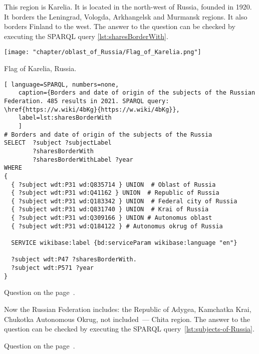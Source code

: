 \begin{exercise}
	\label{answer:subjects_of_Russia_1}
	This region is Karelia. It is located in the north-west of Russia, founded in \num{1920}. It borders the Leningrad, Vologda, Arkhangelsk and Murmansk regions. It also borders Finland to the west.  The answer to the question can be checked by executing the SPARQL query \ref{lst:sharesBorderWith}.
\end{exercise}	
	\begin{marginfigure}[2.0cm]
{
	\setlength{\fboxsep}{0pt}%
	\setlength{\fboxrule}{1pt}%
	\texttt{[image: "chapter/oblast\_of\_Russia/Flag\_of\_Karelia.png"]}
}
\caption [Flag of Karelia, Russia.]{Flag of Karelia, Russia.}%
\label{fig:Flag_of_Karelia}%
\end{marginfigure}
	
	\begin{lstlisting}[ language=SPARQL, numbers=none,
	caption={Borders and date of origin of the subjects of the Russian Federation. 485 results in 2021. SPARQL query: \href{https://w.wiki/4bKg}{https://w.wiki/4bKg}},
	label=lst:sharesBorderWith
	]
# Borders and date of origin of the subjects of the Russia
SELECT  ?subject ?subjectLabel 
        ?sharesBorderWith 
        ?sharesBorderWithLabel ?year
WHERE
{
  { ?subject wdt:P31 wd:Q835714 } UNION  # Oblast of Russia
  { ?subject wdt:P31 wd:Q41162 } UNION  # Republic of Russia
  { ?subject wdt:P31 wd:Q183342 } UNION  # Federal city of Russia
  { ?subject wdt:P31 wd:Q831740 } UNION  # Krai of Russia
  { ?subject wdt:P31 wd:Q309166 } UNION # Autonomus oblast
  { ?subject wdt:P31 wd:Q184122 } # Autonomus okrug of Russia
  
  SERVICE wikibase:label {bd:serviceParam wikibase:language "en"}
  
  ?subject wdt:P47 ?sharesBorderWith. 
  ?subject wdt:P571 ?year
}
\end{lstlisting}
	
\small{Question on the page~\pageref{lst:sharesBorderWith-oblast-of-Russia}.}

\begin{exercise}
	\label{answer:subjects_of_Russia_2}
	Now the Russian Federation includes: the Republic of Adygea, Kamchatka Krai, Chukotka Autonomous Okrug, not included~--- Chita region. The answer to the question can be checked by executing the  SPARQL query~\protect\ref{lst:subjects-of-Russia}.
\end{exercise}	

\small{Question on the page~\pageref{lst:sharesBorderWith-empty-oblast-of-Russia}.}

